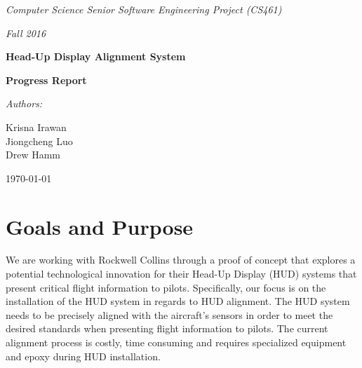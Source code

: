 \documentclass[letterpaper,10pt,onecolumn]{IEEEtran}
\def\name{Krisna Irawan\\ Jiongcheng Luo\\ Drew Hamm}
\def\doc{Progress Report}
\begin{document}
\begin{titlepage}
	\centering
	{\Large\itshape Computer Science Senior Software Engineering Project (CS461)\par}
	{\Large\itshape Fall 2016\par}
	\vspace{1cm}
	{\huge\bfseries Head-Up Display Alignment System\par}
	\vspace{5mm}
	{\huge\bfseries \doc\par}
	\vspace{2cm}
	{\large\itshape Authors:\par}
	{\large \name\par}
	\vspace{5cm}


	\begin{abstract}
	A Head-up Display (HUD), is a transparent display that presents all necessary data that pilots need in their flight environment. This project is a proof concept to explore a potential technological innovation for  HUD system that present critical flight information to pilots. The primary objective of this project is to reduce the cost and time required to precisely align flight information to the HUD by introducing additional sensor to the system to make the alignment process more dynamic. The product being developed is a demonstration system that looks to include a MEMS IRU mounted onto the HUD and a new alignment algorithm that utilizes this additional sensor to determine accurate HUD alignment. This document will cover the progress that we made since the beginning of the term. In this document we include the project goal, purpose, where we are currently, some codes that we have been working on, and the retrospective of the past ten weeks. 
	\end{abstract}
	\vfill
	{\normalsize \today\par}
\end{titlepage}


\section{Goals and Purpose}
We are working with Rockwell Collins through a proof of concept that explores a potential technological innovation for their Head-Up Display (HUD) systems that present critical flight information to pilots. Specifically, our focus is on the installation of the HUD system in regards to HUD alignment. The HUD system needs to be precisely aligned with the aircraft's sensors in order to meet the desired standards when presenting flight information to pilots. The current alignment process is costly, time consuming and requires specialized equipment and epoxy during HUD installation. 
\end{document}
